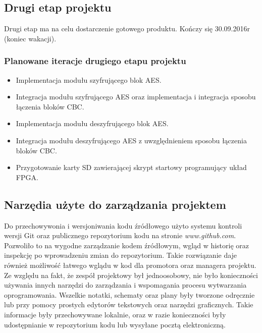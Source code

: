 \subsection{Drugi etap projektu}
Drugi etap ma na celu dostarczenie gotowego produktu. Kończy się 30.09.2016r (koniec wakacji).
\subsubsection{Planowane iteracje drugiego etapu projektu}
\begin{itemize}
\item Implementacja modułu szyfrującego blok AES.
\item Integracja modułu szyfrującego AES oraz implementacja i integracja sposobu łączenia bloków CBC.
\item Implementacja modułu deszyfrującego blok AES.
\item Integracja modułu deszyfrującego AES z uwzględnieniem sposobu łączenia bloków CBC.
\item Przygotowanie karty SD zawierającej skrypt startowy programujący układ FPGA.
\end{itemize}

\subsection{Narzędia użyte do zarządzania projektem}
Do przechowywonia i wersjoniwania kodu źródłowego użyto systemu kontroli wersji Git oraz publicznego repozytorium kodu na stronie \textit{www.github.com}. Pozwoliło to na wygodne zarządzanie kodem źródłowym, wgląd w historię oraz inspekcję po wprowadzeniu zmian do repozytorium. Takie rozwiązanie daje również możliwość łatwego wglądu w kod dla promotora oraz managera projektu.
\break
Ze względu na fakt, że zespół projektowy był jednoosobowy, nie było konieczności używania innych narzędzi do zarządzania i wspomagania procesu wytwarzania oprogramowania. Wszelkie notatki, schematy oraz plany były tworzone odręcznie lub przy pomocy prostych edytorów tekstowych oraz narzędzi graficznych. Takie informacje były przechowywane lokalnie, oraz w razie konieczności były udostępnianie w repozytorium kodu lub wysyłane pocztą elektroniczną.


\newpage